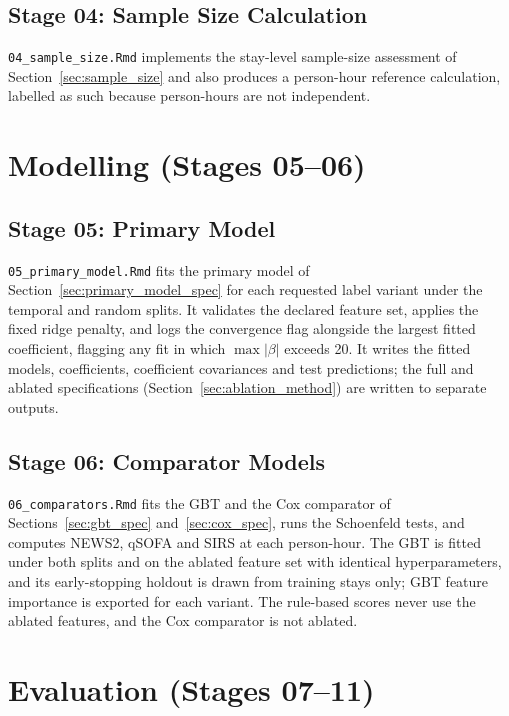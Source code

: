 \subsection{Stage 04: Sample Size Calculation}

\texttt{04\_sample\_size.Rmd} implements the stay-level sample-size assessment
of Section~\ref{sec:sample_size} and also produces a person-hour reference
calculation, labelled as such because person-hours are not independent.


\section{Modelling (Stages 05--06)}

\subsection{Stage 05: Primary Model}

\texttt{05\_primary\_model.Rmd} fits the primary model of
Section~\ref{sec:primary_model_spec} for each requested label variant under the
temporal and random splits. It validates the declared feature set, applies the
fixed ridge penalty, and logs the convergence flag alongside the largest fitted
coefficient, flagging any fit in which $\max|\beta|$ exceeds 20. It writes the
fitted models, coefficients, coefficient covariances and test predictions;
the full and ablated specifications (Section~\ref{sec:ablation_method}) are
written to separate outputs.

\subsection{Stage 06: Comparator Models}

\texttt{06\_comparators.Rmd} fits the GBT and the Cox comparator of
Sections~\ref{sec:gbt_spec} and~\ref{sec:cox_spec}, runs the Schoenfeld tests,
and computes NEWS2, qSOFA and SIRS at each person-hour. The GBT is fitted under
both splits and on the ablated feature set with identical hyperparameters, and
its early-stopping holdout is drawn from training stays only; GBT feature
importance is exported for each variant. The rule-based scores never use the
ablated features, and the Cox comparator is not ablated.


\section{Evaluation (Stages 07--11)}

